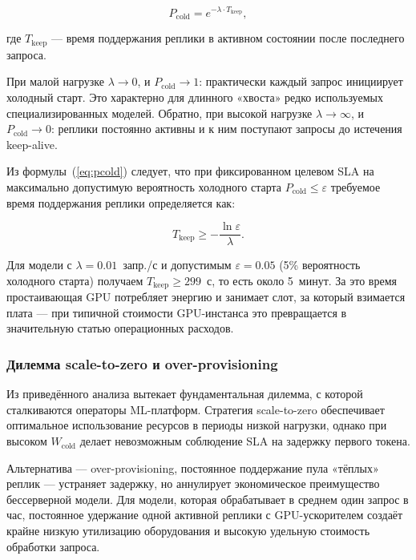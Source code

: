 \begin{equation}
P_{\mathrm{cold}} = e^{-\lambda \cdot T_{\mathrm{keep}}},
\label{eq:pcold}
\end{equation}

где $T_{\mathrm{keep}}$ --- время поддержания реплики в активном состоянии после последнего запроса.

При малой нагрузке $\lambda \to 0$, и $P_{\mathrm{cold}} \to 1$: практически каждый запрос инициирует холодный старт. Это характерно для длинного «хвоста» редко используемых специализированных моделей. Обратно, при высокой нагрузке $\lambda \to \infty$, и $P_{\mathrm{cold}} \to 0$: реплики постоянно активны и к ним поступают запросы до истечения keep-alive.

Из формулы~(\ref{eq:pcold}) следует, что при фиксированном целевом SLA на максимально допустимую вероятность холодного старта $P_{\mathrm{cold}} \leq \varepsilon$ требуемое время поддержания реплики определяется как:

\begin{equation}
T_{\mathrm{keep}} \geq -\frac{\ln \varepsilon}{\lambda}.
\label{eq:keep_alive}
\end{equation}

Для модели с $\lambda = 0.01$~запр./с и допустимым $\varepsilon = 0.05$ (5\% вероятность холодного старта) получаем $T_{\mathrm{keep}} \geq 299$~с, то есть около 5~минут. За это время простаивающая GPU потребляет энергию и занимает слот, за который взимается плата --- при типичной стоимости GPU-инстанса это превращается в значительную статью операционных расходов.

\subsubsection{Дилемма scale-to-zero и over-provisioning}

Из приведённого анализа вытекает фундаментальная дилемма, с которой сталкиваются операторы ML-платформ. Стратегия scale-to-zero обеспечивает оптимальное использование ресурсов в периоды низкой нагрузки, однако при высоком $W_{\mathrm{cold}}$ делает невозможным соблюдение SLA на задержку первого токена.

Альтернатива --- over-provisioning, постоянное поддержание пула «тёплых» реплик --- устраняет задержку, но аннулирует экономическое преимущество бессерверной модели. Для модели, которая обрабатывает в среднем один запрос в час, постоянное удержание одной активной реплики с GPU-ускорителем создаёт крайне низкую утилизацию оборудования и высокую удельную стоимость обработки запроса.

